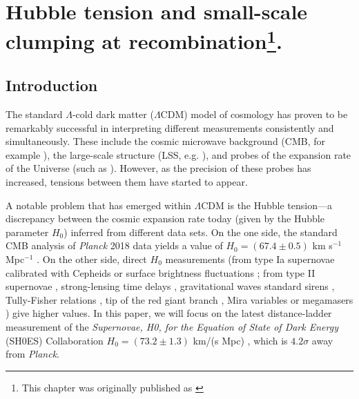 \chapter{Hubble tension and small-scale clumping at recombination\texorpdfstring{\footnote{This chapter was originally published as \cite{clumping21}}.}{}}
\label{ch:H0-clumping}
\graphicspath{{H0-clumping/}}

\section{Introduction}


The standard $\Lambda$-cold dark matter ($\Lambda$CDM) model of cosmology has proven to be remarkably successful in interpreting different measurements consistently and simultaneously.
These include the cosmic microwave background (CMB, for example \cite{WMAP,Planck2018-cosmo}), the large-scale structure (LSS, e.g. \cite{BAO-discovery-Eisenstein-et-al,BAO-discovery-Cole-et-al,BOSS-DR12,DES-Y3}), and probes of the expansion rate of the Universe (such as \cite{accelerated-expansion-perlmutter-et-al,accelerated-expansion-riess-et-al,SH0ES}).
However, as the precision of these probes has increased, tensions between them have started to appear.

A notable problem that has emerged within $\Lambda$CDM is the Hubble tension---a discrepancy between the cosmic expansion rate today (given by the Hubble parameter $H_0$) inferred from different data sets.
On the one side, the standard CMB analysis of {\it Planck} 2018 data yields a value of $H_0=\left( 67.4\pm 0.5 \right)$ km s$^{-1}$ Mpc$^{-1}$ \citep{Planck2018-cosmo}.
On the other side, direct $H_0$ measurements (from type Ia supernovae calibrated with Cepheids \citep{carnegie-hubble,carnegie-supernovae-Ia,near-IR-std-candles,SH0ES} or surface brightness fluctuations \citep{supernovae-Ia-SBF}; from type II supernovae \citep{supernovae-II}, strong-lensing time delays \citep{H0LiCOW,TDCOSMO,STRIDES}, gravitational waves standard sirens \citep{GW-std-sirens}, Tully-Fisher relations \citep{tully-fisher-rel}, tip of the red giant branch \citep{TRGB}, Mira variables \citep{Mira-var} or megamasers \citep{MCP}) give higher values.
In this paper, we will focus on the latest distance-ladder measurement of the {\it Supernovae, H0, for the Equation of State of Dark Energy} (SH0ES) Collaboration $H_0=\left( 73.2\pm 1.3 \right)$ km/(s Mpc) \citep{SH0ES}, which is $4.2\sigma$ away from {\it Planck}.

